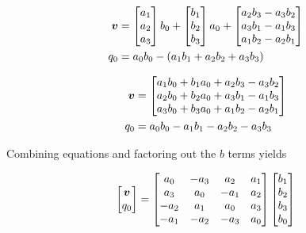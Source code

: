 \begin{subequations}
\begin{align}
  \boldsymbol{v} & = \begin{bmatrix} a_1 \\ a_2 \\ a_3 \end{bmatrix} b_0 +\begin{bmatrix} b_1 \\ b_2 \\ b_3 \end{bmatrix} a_0 + \begin{bmatrix} a_2b_3 - a_3b_2 \\ a_3b_1 - a_1b_3 \\ a_1b_2 - a_2b_1 \\ \end{bmatrix} \\
  q_0 & = a_0 b_0 - (a_1b_1 + a_2b_2 + a_3b_3)
\end{align}
\end{subequations}

\begin{subequations}
\begin{align}
  \boldsymbol{v} & = \begin{bmatrix} a_1b_0 + b_1a_0 + a_2b_3 - a_3b_2 \\ a_2b_0 + b_2a_0 + a_3b_1 - a_1b_3 \\ a_3b_0 + b_3a_0 + a_1b_2 - a_2b_1 \\ \end{bmatrix} \\
  q_0 & = a_0 b_0 - a_1b_1 - a_2b_2 - a_3b_3
\end{align}
\end{subequations}

Combining equations and factoring out the $b$ terms yields

\begin{equation}
  \begin{bmatrix} \boldsymbol{v} \\ q_0 \end{bmatrix} =
  \begin{bmatrix}
    a_0 & - a_3 &   a_2 & a_1 \\
    a_3 &   a_0 & - a_1 & a_2 \\
  - a_2 &   a_1 &   a_0 & a_3 \\
  - a_1 & - a_2 & - a_3 & a_0
  \end{bmatrix}
  \begin{bmatrix}
  b_1 \\ b_2 \\ b_3 \\ b_0
  \end{bmatrix}
\end{equation}

